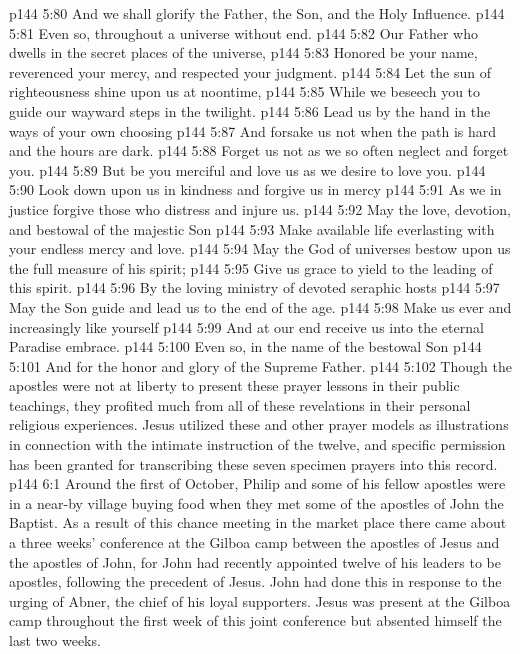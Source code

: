 \vs p144 5:80 \hsetoff And we shall glorify the Father, the Son, and the Holy Influence.
\vs p144 5:81 Even so, throughout a universe without end.
\separatorline
\vs p144 5:82 Our Father who dwells in the secret places of the universe,
\vs p144 5:83 \hsetoff Honored be your name, reverenced your mercy, and respected your judgment.
\vs p144 5:84 Let the sun of righteousness shine upon us at noontime,
\vs p144 5:85 \hsetoff While we beseech you to guide our wayward steps in the twilight.
\vs p144 5:86 Lead us by the hand in the ways of your own choosing
\vs p144 5:87 \hsetoff And forsake us not when the path is hard and the hours are dark.
\vs p144 5:88 Forget us not as we so often neglect and forget you.
\vs p144 5:89 \hsetoff But be you merciful and love us as we desire to love you.
\vs p144 5:90 Look down upon us in kindness and forgive us in mercy
\vs p144 5:91 \hsetoff As we in justice forgive those who distress and injure us.
\vs p144 5:92 May the love, devotion, and bestowal of the majestic Son
\vs p144 5:93 \hsetoff Make available life everlasting with your endless mercy and love.
\vs p144 5:94 May the God of universes bestow upon us the full measure of his spirit;
\vs p144 5:95 \hsetoff Give us grace to yield to the leading of this spirit.
\vs p144 5:96 By the loving ministry of devoted seraphic hosts
\vs p144 5:97 \hsetoff May the Son guide and lead us to the end of the age.
\vs p144 5:98 Make us ever and increasingly like yourself
\vs p144 5:99 \hsetoff And at our end receive us into the eternal Paradise embrace.
\vs p144 5:100 Even so, in the name of the bestowal Son
\vs p144 5:101 \hsetoff And for the honor and glory of the Supreme Father.
\vsetoff
\vs p144 5:102 Though the apostles were not at liberty to present these prayer lessons in their public teachings, they profited much from all of these revelations in their personal religious experiences. Jesus utilized these and other prayer models as illustrations in connection with the intimate instruction of the twelve, and specific permission has been granted for transcribing these seven specimen prayers into this record.
\vs p144 6:1 Around the first of October, Philip and some of his fellow apostles were in a near\hyp{}by village buying food when they met some of the apostles of John the Baptist. As a result of this chance meeting in the market place there came about a three weeks’ conference at the Gilboa camp between the apostles of Jesus and the apostles of John, for John had recently appointed twelve of his leaders to be apostles, following the precedent of Jesus. John had done this in response to the urging of Abner, the chief of his loyal supporters. Jesus was present at the Gilboa camp throughout the first week of this joint conference but absented himself the last two weeks.
